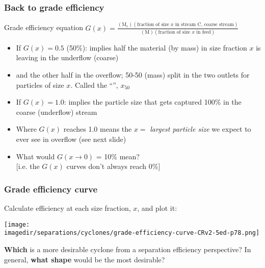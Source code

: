 \begin{frame}\frametitle{Back to grade efficiency}
	\begin{exampleblock}{Grade efficiency equation}
		$G(x) = \displaystyle \frac{(\text{M}_\text{c})(\text{fraction of size $x$ in stream C, coarse stream})}{(\text{M})(\text{fraction of size $x$ in feed})}$
	\end{exampleblock}
	\begin{itemize}
		\item	If $G(x) = 0.5$ (50\%): implies half the material (by mass) in size fraction $x$ is leaving in the underflow (coarse)
		\item	and the other half in the overflow; 50-50 (mass) split in the two outlets for particles of size $x$. Called the ``{\color{purple}{cut size}}'', $x_{50}$
		\item	If $G(x) = 1.0$: implies the particle size that gets captured 100\%  in the coarse (underflow) stream
		\item	Where $G(x)$ reaches 1.0 means the $x=$ \emph{largest particle size} we expect to ever see in {\color{myOrange}overflow} {\small (see next slide)}
		\item	\adv What would $G(x \rightarrow 0)$ = 10\% mean? \\{\scriptsize [i.e. the $G(x)$ curves don't always reach 0\%]}
	\end{itemize}
\end{frame}

\begin{frame}\frametitle{Grade efficiency curve}
	Calculate efficiency at each size fraction, $x$, and plot it:
	\begin{center}
		\texttt{[image: \\imagedir/separations/cyclones/grade-efficiency-curve-CRv2-5ed-p78.png]}
	\end{center}
	{\color{myOrange}\textbf{Which} is a more desirable cyclone} from a separation efficiency perspective? In general, {\color{myOrange}\textbf{what shape}} would be the most desirable?
\end{frame}

